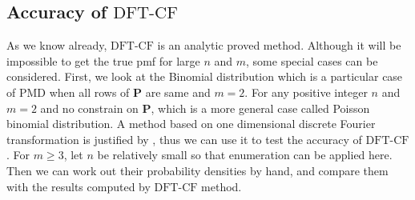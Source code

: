 \documentclass[12pt]{article}
\newcommand{\Pmat}{\mathbf{P}}
\newcommand{\PMD}{\textrm{PMD}}
\newcommand{\dft}{{\textrm{DFT-CF}}}
\begin{document}
\subsection{Accuracy of $\dft$}
As we know already, $\dft$ is an analytic proved method. Although it will be impossible to get the true pmf for large $n$ and $m$, some special cases can be considered. First, we look at the Binomial distribution which is a particular case of $\PMD$ when all rows of $\Pmat$ are same and $m=2$. For any positive integer $n$ and $m=2$ and no constrain on $\Pmat$, which is a more general case called Poisson binomial distribution. A method based on one dimensional discrete Fourier transformation is justified by , thus we can use it to test the accuracy of $\dft$. For $m \geq 3$, let $n$ be relatively small so that enumeration can be applied here. Then we can work out their probability densities by hand, and compare them with the results computed by $\dft$ method.
\end{document}
